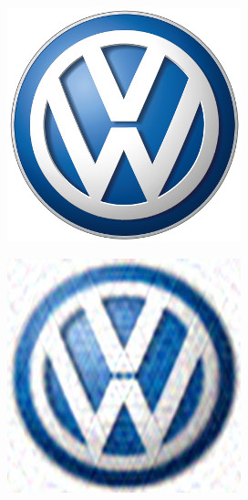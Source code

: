\begin{figure}[h!]
  \centering
  \begin{subfigure}[b]{0.23\textwidth}
    \centering
    \includegraphics[width=\textwidth]{plaatjes/vw.jpg}
  \end{subfigure}
  \begin{subfigure}[b]{0.23\textwidth}
    \centering
    \includegraphics[width=\textwidth]{plaatjes/vw_fourier_0_01.jpg}

\end{subfigure}
\end{figure}

